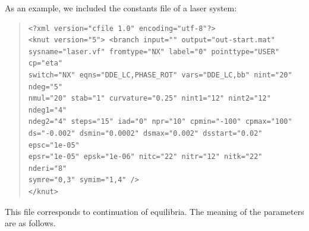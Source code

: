 \documentclass[10pt,a4paper]{ddedoc}
\begin{document}
As an example, we included the constants file of a laser system:
{ \small \begin{quote} \begin{lstlisting}[basicstyle=\tt,frame=single]
<?xml version="cfile 1.0" encoding="utf-8"?>
<knut version="5"> <branch input="" output="out-start.mat"
sysname="laser.vf" fromtype="NX" label="0" pointtype="USER" cp="eta"
switch="NX" eqns="DDE_LC,PHASE_ROT" vars="DDE_LC,bb" nint="20" ndeg="5"
nmul="20" stab="1" curvature="0.25" nint1="12" nint2="12" ndeg1="4"
ndeg2="4" steps="15" iad="0" npr="10" cpmin="-100" cpmax="100"
ds="-0.002" dsmin="0.0002" dsmax="0.002" dsstart="0.02" epsc="1e-05"
epsr="1e-05" epsk="1e-06" nitc="22" nitr="12" nitk="22" nderi="8"
symre="0,3" symim="1,4" />
</knut>
\end{lstlisting} \end{quote} } \noindent
This file corresponds to continuation of equilibria. The meaning of the
parameters are as follows.
\end{document}
